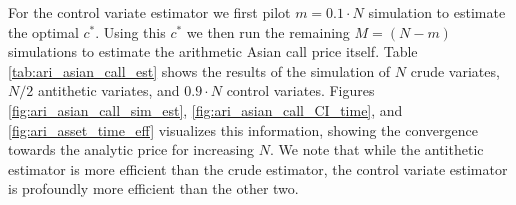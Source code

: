 \documentclass[12pt]{article}
\newlength\tindent
\renewcommand{\indent}{\hspace*{\tindent}}
\begin{document}
\indent For the control variate estimator we first pilot $m = 0.1\cdot N$ simulation to estimate the optimal $c^*$. Using this $c^*$ we then run the remaining $M = (N - m)$ simulations to estimate the arithmetic Asian call price itself. Table \ref{tab:ari_asian_call_est} shows the results of the simulation of $N$ crude variates, $N/2$ antithetic variates, and $0.9 \cdot N$ control variates. Figures \ref{fig:ari_asian_call_sim_est}, \ref{fig:ari_asian_call_CI_time}, and \ref{fig:ari_asset_time_eff} visualizes this information, showing the convergence towards the analytic price for increasing $N$. We note that while the antithetic estimator is more efficient than the crude estimator, the control variate estimator is profoundly more efficient than the other two.

{\footnotesize
{}
}
\end{document}
